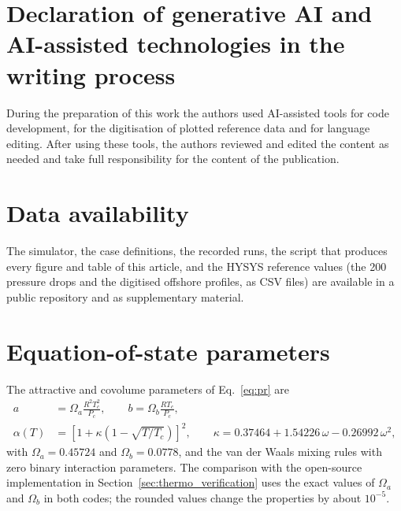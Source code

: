 \documentclass[a4paper,fleqn]{cas-sc}
\begin{document}
\section*{Declaration of generative AI and AI-assisted technologies in the writing process}
During the preparation of this work the authors used AI-assisted tools for code development, for the digitisation of plotted reference data and for language editing. After using these tools, the authors reviewed and edited the content as needed and take full responsibility for the content of the publication.

\section*{Data availability}
The simulator, the case definitions, the recorded runs, the script that produces every figure and table of this article, and the HYSYS reference values (the 200 pressure drops and the digitised offshore profiles, as CSV files) are available in a public repository and as supplementary material.

\FloatBarrier
\appendix
\setcounter{equation}{0}
\setcounter{table}{0}
\setcounter{figure}{0}
\section{Equation-of-state parameters}\label{app:eos}
The attractive and covolume parameters of Eq.~\eqref{eq:pr} are
\begin{equation}\label{eq:pr_ab}
\begin{aligned}
a &= \Omega_a \frac{R^2 T_c^2}{P_c}, \qquad b = \Omega_b \frac{R T_c}{P_c},\\
\alpha(T) &= \left[1 + \kappa\left(1 - \sqrt{T/T_c}\right)\right]^2, \qquad \kappa = 0.37464 + 1.54226\,\omega - 0.26992\,\omega^2,
\end{aligned}
\end{equation}
with $\Omega_a = 0.45724$ and $\Omega_b = 0.0778$, and the van der Waals mixing rules with zero binary interaction parameters. The comparison with the open-source implementation in Section~\ref{sec:thermo_verification} uses the exact values of $\Omega_a$ and $\Omega_b$ in both codes; the rounded values change the properties by about $10^{-5}$.
\end{document}
